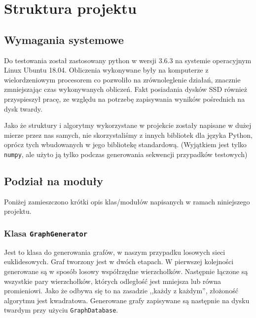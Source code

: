 
\section{Struktura projektu}
	\label{final:struktura}

	\subsection{Wymagania systemowe}
		\label{final:struktura:wymagania}

		Do testowania został zastosowany python w wersji 3.6.3 na systemie operacyjnym Linux Ubuntu 18.04. Obliczenia wykonywane były na komputerze z wielordzeniowym procesorem co pozwoliło na zrównoleglenie działań, znacznie zmniejszając czas wykonywanych obliczeń. Fakt posiadania dysków SSD również przyspieszył pracę, ze względu na potrzebę zapisywania wyników pośrednich na dysk twardy.

		Jako że struktury i algorytmy wykorzystane w projekcie zostały napisane w dużej mierze przez nas samych, nie skorzystaliśmy z innych bibliotek dla języka Python, oprócz tych wbudowanych w jego bibliotekę standardową. (Wyjątkiem jest tylko \texttt{numpy}, ale użyto ją tylko podczas generowania sekwencji przypadków testowych)

	\subsection{Podział na moduły}
		\label{final:struktura:klasy}


		Poniżej zamieszczono krótki opis klas/modułów napisanych w ramach niniejszego projektu.

		\subsubsection{Klasa \texttt{GraphGenerator}}

			Jest to klasa do generowania grafów, w naszym przypadku losowych sieci euklidesowych. Graf tworzony jest w dwóch etapach. W pierwszej kolejności generowane są w sposób losowy współrzędne wierzchołków. Następnie łączone są wszystkie pary wierzchołków, których odległość jest mniejsza lub równa promieniowi. Jako że odbywa się to na zasadzie ,,każdy z każdym'', złożoność algorytmu jest kwadratowa. Generowane grafy zapisywane są następnie na dysku twardym przy użyciu \texttt{GraphDatabase}.

